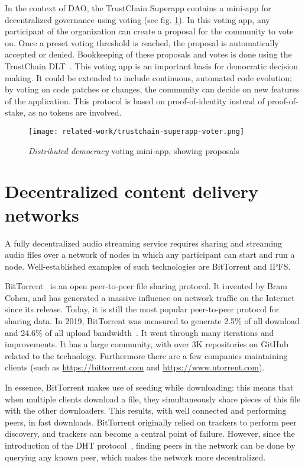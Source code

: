 In the context of DAO, the TrustChain Superapp contains a mini-app for decentralized governance using voting (see fig. \ref{fig:trustchain-superapp-voter}). In this voting app, any participant of the organization can create a proposal for the community to vote on. Once a preset voting threshold is reached, the proposal is automatically accepted or denied. Bookkeeping of these proposals and votes is done using the TrustChain DLT~\citep{otte2017trustchain}. This voting app is an important basis for democratic decision making. It could be extended to include continuous, automated code evolution: by voting on code patches or changes, the community can decide on new features of the application. This protocol is based on proof-of-identity instead of proof-of-stake, as no tokens are involved.

\begin{figure}
    \centering
    \texttt{[image: related-work/trustchain-superapp-voter.png]}
    \caption{\textit{Distributed democracy} voting mini-app, showing proposals}
    \label{fig:trustchain-superapp-voter}
\end{figure}


\section{Decentralized content delivery networks}
\label{sec:decentralized-content-delivery}
A fully decentralized audio streaming service requires sharing and streaming audio files over a network of nodes in which any participant can start and run a node. Well-established examples of such technologies are BitTorrent and IPFS.

BitTorrent~\citep{cohen2002bittorrent} is an open peer-to-peer file sharing protocol. It invented by Bram Cohen, and has generated a massive influence on network traffic on the Internet since its release. Today, it is still the most popular peer-to-peer protocol for sharing data. In 2019, BitTorrent was measured to generate 2.5\% of all download and 24.6\% of all upload bandwidth~\citep{marozzo2020}. It went through many iterations and improvements. It has a large community, with over 3K repositories on GitHub related to the technology. Furthermore there are a few companies maintaining clients (such as \url{https://bittorrent.com} and \url{https://www.utorrent.com}).

In essence, BitTorrent makes use of seeding while downloading: this means that when multiple clients download a file, they simultaneously share pieces of this file with the other downloaders. This results, with well connected and performing peers, in fast downloads. BitTorrent originally relied on trackers to perform peer discovery, and trackers can become a central point of failure. However, since the introduction of the DHT protocol~\citep{bittorrentbep5dht}, finding peers in the network can be done by querying any known peer, which makes the network more decentralized. 

